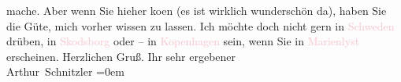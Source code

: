                     mache. Aber wenn Sie hieher ko{\geminationm}en (es ist wirklich
                    wunderschön da), haben Sie die Güte, mich vorher wissen zu lassen. Ich möchte
                    doch nicht gern in \textcolor{pink}{Schweden}{}\ledrightnote{\textcolor{pink}{Schweden}} drüben, in \textcolor{pink}{Skodsborg}{}\ledrightnote{\textcolor{pink}{Skodsborg}} oder – in \textcolor{pink}{Kopenhagen}{}\ledrightnote{\textcolor{pink}{Kopenhagen}} sein, wenn Sie in \textcolor{pink}{Marienlyst}{}\ledrightnote{\textcolor{pink}{Marienlyst}} erscheinen.\pend
           \pstart
           Herzlichen Gruß. Ihr sehr ergebener{\\[\baselineskip]}\spacefill\mbox{Arthur Schnitzler}\pend
           \leftskip=0em{}\endnumbering{}  
      